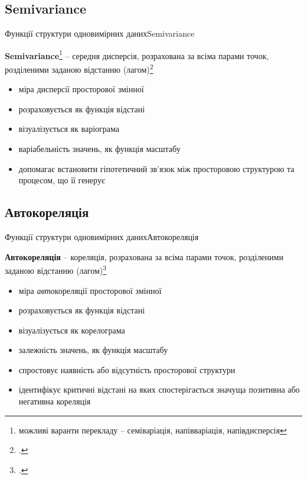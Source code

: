 \documentclass[]{beamer}
\begin{document}
\subsection{Semivariance}
\begin{frame}{Функції структури одновимірних даних}{Semivariance}

\textbf{Semivariance}\footnote{можливі варанти перекладу -- семіваріація, напівваріація, напівдисперсія} -- середня дисперсія, розрахована за всіма парами точок, розділеними заданою відстанню (лагом)\footcite{Legendre2012}


\begin{itemize}
	\item міра дисперсії просторової змінної 
	\item розраховується як функція відстані
	\item візуалізується як варіограма 
	\item варіабельність значень, як функція масштабу
	\item допомагає встановити гіпотетичний \textcolor{MyBlue}{зв'язок між просторовою структурою та процесом}, що її генерує
\end{itemize}

\end{frame}

\subsection{Автокореляція}
\begin{frame}{Функції структури одновимірних даних}{Автокореляція}

\textbf{Автокореляція} -- кореляція, розрахована за всіма парами точок, розділеними заданою відстанню (лагом)\footcite{Legendre2012}


\begin{itemize}
	\item міра \textit{авто}кореляції просторової змінної 
	\item розраховується як функція відстані
	\item візуалізується як корелограма 
	\item залежність значень, як функція масштабу
	\item спростовує \textcolor{MyBlue}{наявність або відсутність просторової структури}
	\item ідентифікує \textcolor{MyBlue}{критичні відстані} на яких спостерігається значуща позитивна або негативна кореляція
\end{itemize}

\end{frame}
\end{document}
